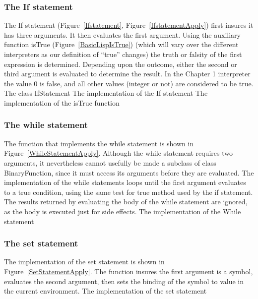 \subsubsection{The If statement}

The If statement (Figure~\ref{Ifstatement}, Figure~\ref{IfstatementApply}) first
insures it has three arguments.  It then evaluates the first argument.  Using
the auxiliary function {\sf isTrue} (Figure~\ref{BasicLispIsTrue}) (which will
vary over the different interpreters as our definition of ``true'' changes) the
truth or falsity of the first expression is determined.  Depending upon the
outcome, either the second or third argument is evaluated to determine the
result.  In the Chapter 1 interpreter the value 0 is false, and all other values
(integer or not) are considered to be true.
%
{The class {\sf IfStatement}}
%
{The implementation of the If statement}
%
{The implementation of the {\sf isTrue} function}

\subsubsection{The while statement}

The function that implements the while statement is shown in
Figure~\ref{WhileStatementApply}.  Although the while statement requires two
arguments, it nevertheless cannot usefully be made a subclass of class {\sf
    BinaryFunction}, since it must access its arguments before they are
evaluated.  The implementation of the while statements loops until the first
argument evaluates to a true condition, using the same test for true method used
by the if statement.  The results returned by evaluating the body of the while
statement are ignored, as the body is executed just for side effects.
%
{The implementation of the While statement}

\subsubsection{The set statement}

The implementation of the set statement is shown in
Figure~\ref{SetStatementApply}.  The function insures the first argument is a
symbol, evaluates the second argument, then sets the binding of the symbol to
value in the current environment.
%
{The implementation of the set statement}

